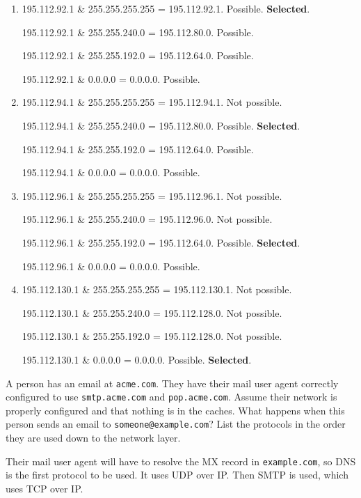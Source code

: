 \begin{Answer}
\begin{enumerate}
\item 195.112.92.1 \& 255.255.255.255 = 195.112.92.1. Possible. \textbf{Selected}.

195.112.92.1 \& 255.255.240.0 = 195.112.80.0. Possible.

195.112.92.1 \& 255.255.192.0 = 195.112.64.0. Possible.

195.112.92.1 \& 0.0.0.0 = 0.0.0.0. Possible.

\item 195.112.94.1 \& 255.255.255.255 = 195.112.94.1. Not possible.

195.112.94.1 \& 255.255.240.0 = 195.112.80.0. Possible. \textbf{Selected}.

195.112.94.1 \& 255.255.192.0 = 195.112.64.0. Possible.

195.112.94.1 \& 0.0.0.0 = 0.0.0.0. Possible.

\item 195.112.96.1 \& 255.255.255.255 = 195.112.96.1. Not possible.

195.112.96.1 \& 255.255.240.0 = 195.112.96.0. Not possible.

195.112.96.1 \& 255.255.192.0 = 195.112.64.0. Possible. \textbf{Selected}.

195.112.96.1 \& 0.0.0.0 = 0.0.0.0. Possible.

\item 195.112.130.1 \& 255.255.255.255 = 195.112.130.1. Not possible.

195.112.130.1 \& 255.255.240.0 = 195.112.128.0. Not possible.

195.112.130.1 \& 255.255.192.0 = 195.112.128.0. Not possible.

195.112.130.1 \& 0.0.0.0 = 0.0.0.0. Possible. \textbf{Selected}.
\end{enumerate}
\end{Answer}

\begin{Exercise}
A person has an email at \texttt{acme.com}. They have their mail user agent correctly configured to use \texttt{smtp.acme.com} and \texttt{pop.acme.com}.
Assume their network is properly configured and that nothing is in the caches.
What happens when this person sends an email to \texttt{someone@example.com}?
List the protocols in the order they are used down to the network layer.
\end{Exercise}
\begin{Answer}
Their mail user agent will have to resolve the MX record in \texttt{example.com}, so DNS is the first protocol to be used. It uses UDP over IP.
Then SMTP is used, which uses TCP over IP.
\end{Answer}

